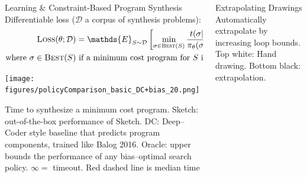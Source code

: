 \documentclass[final]{beamer}
\newcommand{\expect}{\mathds{E}} %
\newlength{\onecolwid}
\newlength{\twocolwid}
\newcommand{\expect}{\mathds{E}} %
\begin{document}
\begin{frame}[t]
\begin{columns}[t]
\begin{column}{\twocolwid}
\begin{columns}[t,totalwidth=\twocolwid]
\begin{column}{\onecolwid}
\begin{block}{Learning \& Constraint-Based Program Synthesis}
Differentiable loss ($\mathcal{D}$ a corpus of synthesis problems):
\begin{align}
\textsc{Loss}(\theta ; \mathcal{D})& =  \expect_{S\sim\mathcal{D}}\left[ \min_{\sigma\in \text{\textsc{Best}}(S)}\frac{t(\sigma | S)}{\pi_\theta (\sigma | S)}\right] + \lambda \Vert\theta\Vert_2^2\label{policyLoss}\\
\text{where }  \sigma \in\text{\textsc{Best}}(S) &\text{ if  a minimum cost program for }S \text{ is in }\sigma .\nonumber %
\end{align}

\texttt{[image: figures/policyComparison\_basic\_DC+bias\_20.png]}

Time to synthesize a minimum cost program. Sketch: out-of-the-box performance of Sketch. DC: Deep--Coder style baseline that predicts program components, trained like Balog 2016. Oracle:  upper bounds  the performance of any bias--optimal search policy. $\infty = $ timeout. Red dashed line is median time
  \end{block}




\end{column} %

\begin{column}{\onecolwid}\vspace{-.6in} %


  \begin{block}{Extrapolating Drawings}
    Automatically extrapolate by increasing loop bounds. Top white: Hand drawing. Bottom black: extrapolation.
    

\end{block}
\end{column}
\end{columns}
\end{column}
\end{columns}
\end{frame}
\end{document}
